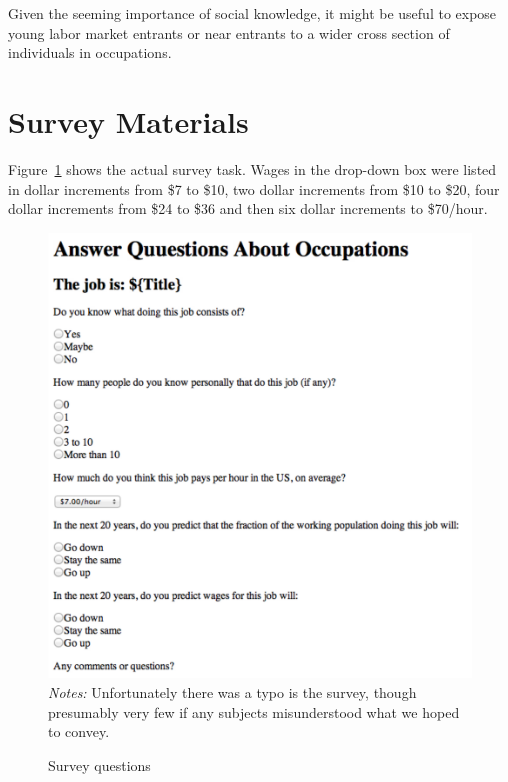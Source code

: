 \documentclass[12pt]{article}
\begin{document}
Given the seeming importance of social knowledge, it might be useful to expose young labor market entrants or near entrants to a wider cross section of individuals in occupations.
 




\newpage 

\appendix 

\section{Survey Materials} \label{sec:survey}  
Figure~\ref{fig:survey} shows the actual survey task.  
Wages in the drop-down box were listed in dollar increments from \$7 to \$10, two dollar increments from \$10 to \$20, four dollar increments from \$24 to \$36 and then six dollar increments to \$70/hour.  

\begin{figure}
\centering
\caption{Survey questions \label{fig:survey}}
\begin{minipage}{0.75 \linewidth}
\includegraphics[width = \linewidth]{./images/survey.png}
\emph{Notes:} Unfortunately there was a typo is the survey, though presumably very few if any subjects misunderstood what we hoped to convey. 
\end{minipage}  
\end{figure} 
\end{document}
